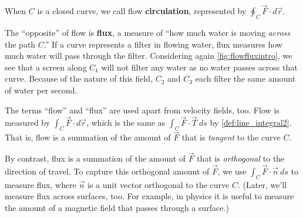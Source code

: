 When $C$ is a closed curve, we call flow \textbf{circulation}, represented by $\oint_C \vec F\cdot d\vec r$.


The ``opposite'' of flow is \textbf{flux}, a measure of ``how much water is moving \emph{across} the path $C$.'' If a curve represents a filter in flowing water, flux measures how much water will pass through the filter. Considering again \autoref{fig:flowfluxintro}, we see that a screen along $C_1$ will not filter any water as no water passes across that curve. Because of the nature of this field,  $C_2$ and $C_3$ each filter the same amount of water per second. 

The terms ``flow'' and ``flux'' are used apart from velocity fields, too. Flow is measured by $\int_C \vec F\cdot d\vec r$, which is the same as $\int_C \vec F\cdot\vec T\ ds$ by \autoref{def:line_integral2}. That is, flow is a summation of the amount of $\vec F$ that is \emph{tangent} to the curve $C$. %

By contrast, flux is a summation of the amount of $\vec F$ that is \emph{orthogonal} to the direction of travel. To capture this orthogonal amount of $\vec F$, we use $\int_C \vec F \cdot \vec n\ ds$ to measure flux, where $\vec n$ is a unit vector orthogonal to the curve $C$. %
(Later, we'll measure flux across surfaces, too. %
For example, in physics it is useful to measure the amount of a magnetic field that passes through a surface.)


